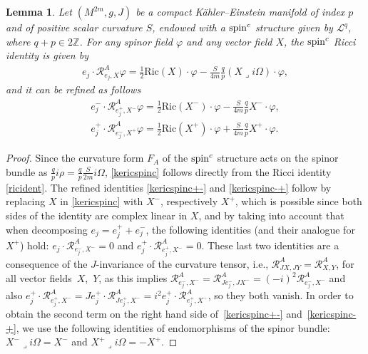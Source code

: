 \documentclass[10pt,a4paper]{amsart}
\numberwithin{equation}{section}
\newtheorem{lem}[thm]{Lemma}
\theoremstyle{definition}
\begin{document}
\begin{lem} \label{lemmacit}
Let $(M^{2m},g,J)$ be a compact K\"ahler--Einstein manifold of index $p$ and of positive scalar curvature $S$, endowed with a ${\mathop{\rm spin}^c}$ structure given by $\mathcal{L}^q$, where  $q+p\in2\mathbb{Z}$. For any spinor field $\varphi$ and any vector field $X$, the ${\mathop{\rm spin}^c}$ Ricci identity is given by
\begin{gather} \label{kericspinc}
e_j \cdot\mathcal{R}^A_{e_j,X} \varphi = \frac{1}{2}\mathrm{Ric}(X) \cdot\varphi- \frac{S}{4m}\frac{q}{p} (X\lrcorner i\Omega)\cdot\varphi,
\end{gather}
and it can be refined as follows
\begin{gather}\label{kericspinc+-}
e^-_j \cdot\mathcal{R}^A_{e^+_j,X^-} \varphi =\frac{1}{2}\mathrm{Ric}(X^-)\cdot \varphi -\frac{S}{4m}\frac{q}{p} X^-\cdot\varphi,
\\
\label{kericspinc-+}
e^+_j \cdot\mathcal{R}^A_{e^-_j,X^+} \varphi  = \frac{1}{2}\mathrm{Ric}(X^+)\cdot \varphi +\frac{S}{4m}\frac{q}{p} X^+\cdot\varphi.
\end{gather}
\end{lem}

\begin{proof} Since the  curvature form $F_A$ of the ${\mathop{\rm spin}^c}$ structure acts on the spinor bundle as $\frac{q}{p}i\rho=\frac{q}{p} \frac{S}{2m} i\Omega$, \eqref{kericspinc} follows directly from the Ricci identity \eqref{ricident}. The ref\/ined identities \eqref{kericspinc+-} and \eqref{kericspinc-+}  follow by replacing $X$ in \eqref{kericspinc} with $X^-$, respectively $X^+$, which is possible since both sides of the identity are complex linear in $X$, and by taking into account that when decomposing $e_j=e_j^+ + e^-_j$, the following identities (and their analogue for $X^+$) hold: $e_j \cdot\mathcal{R}^A_{e^-_j,X^-}=0$ and $e^+_j \cdot\mathcal{R}^A_{e^+_j,X^-}=0$. These last two identities are a consequence of the $J$-invariance of the curvature tensor,  i.e.,  $\mathcal{R}^A_{JX,JY}=\mathcal{R}^A_{X,Y}$,
for all vector f\/ields~$X$,~$Y$, as this implies $\mathcal{R}^A_{e^-_j,X^-}=\mathcal{R}^A_{Je^-_j,JX^-}=(-i)^2\mathcal{R}^A_{e^-_j,X^-}$ and also $e^+_j \cdot\mathcal{R}^A_{e^+_j,X^-}=Je^+_j \cdot\mathcal{R}^A_{Je^+_j,X^-}=i^2 e^+_j \cdot\mathcal{R}^A_{e^+_j,X^-}$, so they both vanish. In order to obtain the second term on the right hand side of~\eqref{kericspinc+-} and~\eqref{kericspinc-+}, we use the following identities
 of endomorphisms of the spinor bundle: $X^-\lrcorner i\Omega=X^-$ and $X^+\lrcorner i\Omega=-X^+$.
\end{proof}
\end{document}
